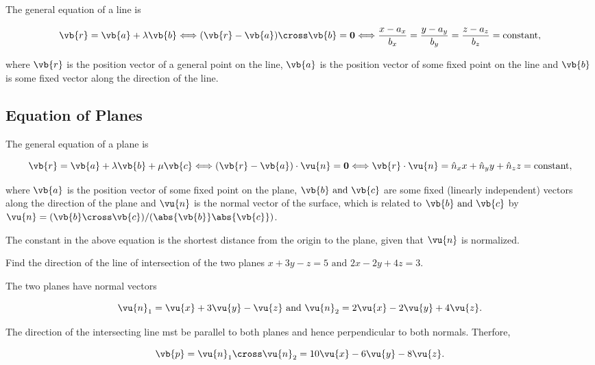 \documentclass[a4paper,12pt]{report}
\begin{document}
The general equation of a line is 

\begin{equation}
    \vb{r} = \vb{a} + \lambda \vb{b} \Longleftrightarrow (\vb{r} - \vb{a} ) \cross \vb{b} = \boldsymbol{0} \Longleftrightarrow \frac{x-a_{x} }{b_{x} } = \frac{y - a_{y} }{b_{y} } = \frac{z - a_{z} }{b_{z} } = \text{constant}, 
\end{equation}

where \(\vb{r} \) is the position vector of a general point on the line, \(\vb{a} \) is the position vector of some fixed point on the line and \(\vb{b} \) is some fixed vector along the direction of the line.   

\subsection{Equation of Planes}

The general equation of a plane is 

\begin{equation}
    \vb{r} = \vb{a} + \lambda \vb{b} + \mu \vb{c} \Longleftrightarrow (\vb{r} - \vb{a} ) \cdot \vu{n} = \boldsymbol{0} \Longleftrightarrow \vb{r} \cdot \vu{n} = \hat{n}_{x} x + \hat{n}_{y} y + \hat{n}_{z} z = \text{constant} , 
\end{equation}

where \(\vb{a} \) is the position vector of some fixed point on the plane, \(\vb{b} \text { and } \vb{c} \) are some fixed (linearly independent) vectors along the direction of the plane and \(\vu{n}\) is the normal vector of the surface, which is related to \(\vb{b} \text { and } \vb{c} \) by \(\vu{n} = (\vb{b} \cross \vb{c}) / (\abs{\vb{b} } \abs{\vb{c} }) \).

The constant in the above equation is the shortest distance from the origin to the plane, given that \(\vu{n} \) is normalized.

{Find the direction of the line of intersection of the two planes \(x+3y-z=5 \text { and } 2x-2y+4z=3\). }
{The two planes have normal vectors 

\begin{equation}
    \vu{n} _{1} = \vu{x} + 3\vu{y} -\vu{z} \text { and } \vu{n} _{2} = 2\vu{x} -2\vu{y} + 4\vu{z}.
\end{equation}

The direction of the intersecting line mst be parallel to both planes and hence perpendicular to both normals. Therfore, 

\begin{equation}
    \vb{p} = \vu{n} _{1}\cross \vu{n} _{2} = 10\vu{x}-6\vu{y} -8\vu{z}.
\end{equation}
~} 
\end{document}
